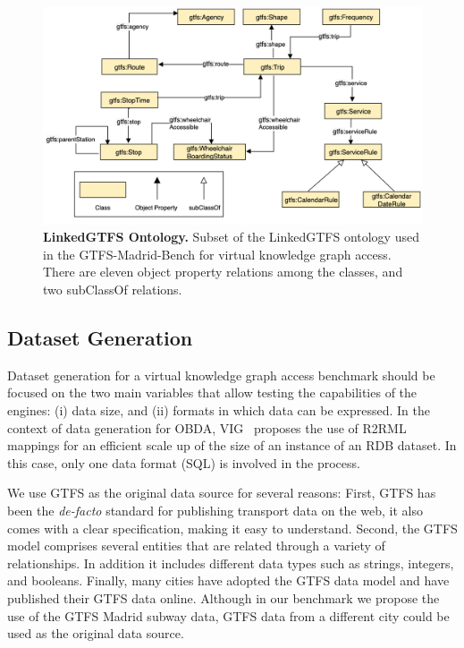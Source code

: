 \begin{figure}
    \centering
    \includegraphics[width=0.8\linewidth]{figures/GTFSontology.png}
    \caption[The LinkedGTFS Ontology]{\textbf{LinkedGTFS Ontology.} Subset of the LinkedGTFS ontology used in the GTFS-Madrid-Bench for virtual knowledge graph access. There are eleven object property relations among the classes, and two subClassOf relations.}
    \label{fig:gtfsOntology}
\end{figure}

\subsection{Dataset Generation}

Dataset generation for a virtual knowledge graph access benchmark should be focused on the two main variables that allow testing the capabilities of the engines: (i) data size, and (ii) formats in which data can be expressed. In the context of data generation for OBDA, VIG~\citep{lantivig} proposes the use of R2RML mappings for an efficient scale up of the size of an instance of an RDB dataset. In this case, only one data format (SQL) is involved in the process. 

We use GTFS as the original data source for several reasons: First, GTFS has been the \textit{de-facto} standard for publishing transport data on the web, it also comes with a clear specification, making it easy to understand. Second, the GTFS model comprises several entities that are related through a variety of relationships. In addition it includes different data types such as strings, integers, and booleans. Finally, many cities have adopted the GTFS data model and have published their GTFS data online. Although in our benchmark we propose the use of the GTFS Madrid subway data, GTFS data from a different city could be used as the original data source.

